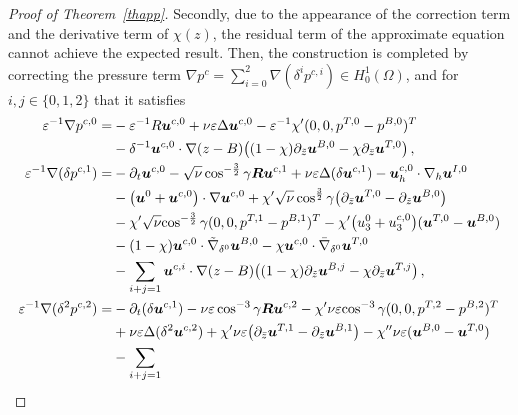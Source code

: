 \documentclass[pdflatex,sn-mathphys-num]{sn-jnl}%
\theoremstyle{thmstyleone}%
\theoremstyle{thmstyletwo}%
\theoremstyle{thmstylethree}%
\theoremstyle{thmstyletwo}
\begin{document}
\begin{proof}[Proof of Theorem~{\upshape\ref{thapp}}]
Secondly, due to the appearance of the correction term and the derivative term of $\chi(z)$, the residual term of the approximate equation cannot achieve the expected result. Then, the construction is completed by correcting the pressure term $\nabla{p}^c=\sum_{i=0}^2\nabla(\delta^i{p}^{c,i})\in H_0^1(\Omega)$, and for $i,j\in \{0,1,2\}$ that it satisfies 
\begin{align}
	\varepsilon^{-1}\nabla p^{c,0}=&
	-\varepsilon^{-1}R \boldsymbol u^{c,0}+\nu\varepsilon \Delta  \boldsymbol u^{c,0}
	-\varepsilon^{-1}\chi'(0,0,p^{T,0}-p^{B,0})^T\notag\\
	&-\delta^{-1}\boldsymbol{u}^{c,0}\cdot\nabla(z-B)\big(
	(1-\chi)\partial_{\tilde{z}}\boldsymbol{u}^{B,0}-\chi\partial_{\bar{z}}\boldsymbol{u}^{T,0}\big)\,,\label{2.39}\\
	\varepsilon^{-1}\nabla (\delta p^{c,1})=
	&-\partial_t\boldsymbol{u}^{c,0}-\sqrt{\nu}\cos^{-\frac{3}{2}}\gamma \boldsymbol{R} \boldsymbol u^{c,1}+\nu\varepsilon \Delta  (\delta\boldsymbol u^{c,1})-\boldsymbol{u}_h^{c,0}\cdot\nabla_h {\boldsymbol{u}}^{I,0}\notag\\
	&-\big({\boldsymbol{u}}^{0}+\boldsymbol{u}^{c,0}\big)\cdot\nabla\boldsymbol{u}^{c,0}+\chi'\sqrt{\nu}\cos^{\frac32}\gamma
	\big(
	\partial_{\bar{z}}\boldsymbol{u}^{T,0}
	-\partial_{\tilde{z}}\boldsymbol{u}^{B,0}
	\big)
	\notag\\
	&
	-\chi'{\sqrt{\nu}}{\cos^{-\frac32}\gamma}(0,0,p^{T,1}-p^{B,1})^T
	-\chi'\big({u}^{0}_3+{u}_3^{c,0}\big)(\boldsymbol{u}^{T,0}-\boldsymbol{u}^{B,0})
	\notag\\
	&
	-(1-\chi)\boldsymbol{u}^{c,0}\cdot\tilde{\nabla}_{\delta^0}\boldsymbol{u}^{B,0}
	-\chi\boldsymbol{u}^{c,0}\cdot\bar{\nabla}_{\delta^0}\boldsymbol{u}^{T,0}
	\notag\\
	&
	-\sum_{i+j=1}\boldsymbol{u}^{c,i}
	\cdot\nabla(z-B)\big(
	(1-\chi)\partial_{\tilde{z}}\boldsymbol{u}^{B,j}-\chi\partial_{\bar{z}}\boldsymbol{u}^{T,j}\big)\,,\label{2.40}\\
	\varepsilon^{-1}\nabla (\delta^2 p^{c,2})=&
	-\partial_t(\delta\boldsymbol{u}^{c,1})-\nu\varepsilon\cos^{-3}\gamma \boldsymbol{R} \boldsymbol u^{c,2}
	-\chi'{\nu\varepsilon}{\cos^{-3}\gamma}(0,0,p^{T,2}-p^{B,2})^T\notag\\
	&+\nu\varepsilon \Delta  (\delta^2\boldsymbol u^{c,2})
	+\chi'{\nu}\varepsilon
	\big(
	\partial_{\bar{z}}\boldsymbol{u}^{T,1}
	-\partial_{\tilde{z}}\boldsymbol{u}^{B,1}
	\big)-\chi''\nu\varepsilon(\boldsymbol{u}^{B,0}-\boldsymbol{u}^{T,0})
	\notag\\
	&-\sum_{i+j=1}

\end{align}
\end{proof}
\end{document}
